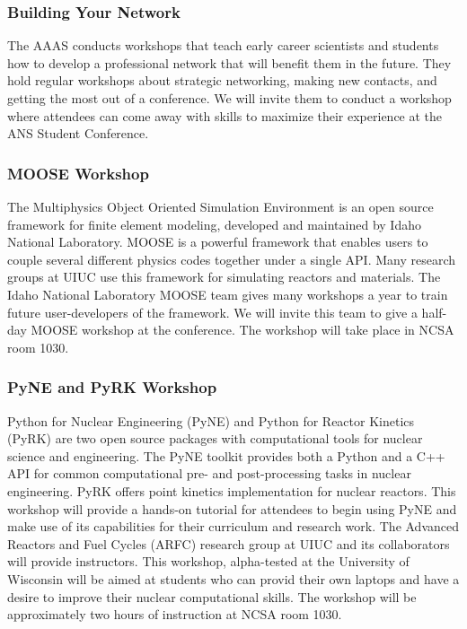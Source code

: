 \subsubsection{Building Your Network}
The AAAS conducts workshops that teach early career scientists and students how to develop a professional network that will benefit them in the future. They hold regular workshops about strategic networking, making new contacts, and getting the most out of a conference. We will invite them to conduct a workshop where attendees can come away with skills to maximize their experience at the ANS Student Conference.

\subsubsection{MOOSE Workshop}
The Multiphysics Object Oriented Simulation Environment is an open source framework for finite element modeling, developed and maintained by Idaho National Laboratory. MOOSE is a powerful framework that enables users to couple several different physics codes together under a single API. Many research groups at UIUC use this framework for simulating reactors and materials. The Idaho National Laboratory MOOSE team gives many workshops a year to train future user-developers of the framework. We will invite this team to give a half-day MOOSE workshop at the conference. The workshop will take place in NCSA room 1030.

\subsubsection{PyNE and PyRK Workshop}
Python for Nuclear Engineering (PyNE) and Python for Reactor Kinetics (PyRK) are two open source packages with computational tools for nuclear science and engineering. The PyNE toolkit provides both a Python and a C++ API for common computational pre- and post-processing tasks in nuclear engineering. PyRK offers point kinetics implementation for nuclear reactors. This workshop will provide a hands-on tutorial for attendees to begin using PyNE and make use of its capabilities for their curriculum and research work. The Advanced Reactors and Fuel Cycles (ARFC) research group at UIUC and its collaborators will provide instructors. This workshop, alpha-tested at the University of Wisconsin will be aimed at students who can provid their own laptops and have a desire to improve their nuclear computational skills. The workshop will be approximately two hours of instruction at NCSA room 1030.


